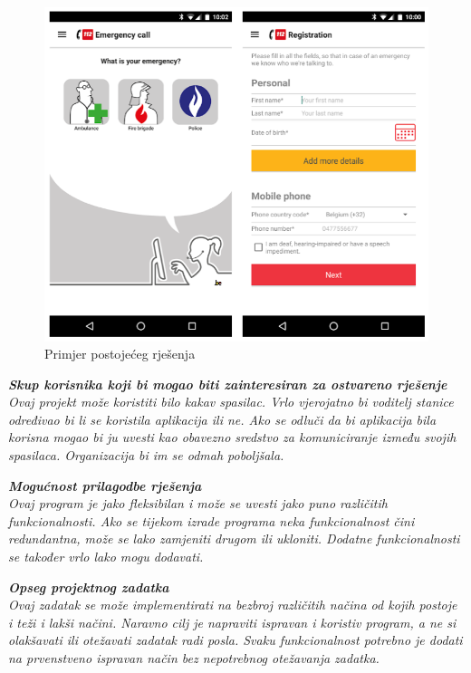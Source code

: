		\begin{figure}[H]
			\includegraphics[scale=0.5]{slike/112-app-options.PNG}
			\centering
			\caption{Primjer postojećeg rješenja}
			\label{fig:112_BE}
			\end{figure}
		
		\textbf{\textit{Skup korisnika koji bi mogao biti zainteresiran za ostvareno rješenje}}\\
		\textit{Ovaj projekt može koristiti bilo kakav spasilac. Vrlo vjerojatno bi voditelj stanice određivao bi li se koristila aplikacija ili ne. Ako se odluči da bi aplikacija bila korisna mogao bi ju uvesti kao obavezno sredstvo za komuniciranje između svojih spasilaca. Organizacija bi im se odmah poboljšala.}
		
		\textbf{\textit{Mogućnost prilagodbe rješenja}}\\
		\textit{Ovaj program je jako fleksibilan i može se uvesti jako puno različitih funkcionalnosti. Ako se tijekom izrade programa neka funkcionalnost čini redundantna, može se lako zamjeniti drugom ili ukloniti. Dodatne funkcionalnosti se također vrlo lako mogu dodavati.}
		
		\textbf{\textit{Opseg projektnog zadatka}}\\
		\textit{Ovaj zadatak se može implementirati na bezbroj različitih načina od kojih postoje i teži i lakši načini. Naravno cilj je napraviti ispravan i koristiv program, a ne si olakšavati ili otežavati zadatak radi posla. Svaku funkcionalnost potrebno je dodati na prvenstveno ispravan način bez nepotrebnog otežavanja zadatka.}
		
